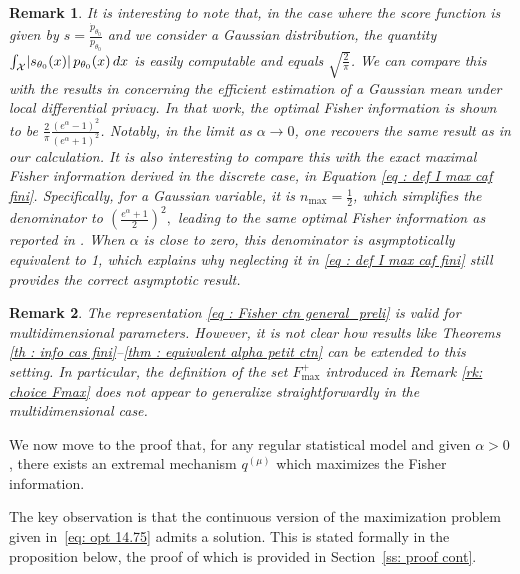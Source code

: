 \documentclass[a4paper, 11pt]{article}
\newtheorem{rem}{Remark}
\theoremstyle{definition}
\DeclarePairedDelimiter{\abs}{\lvert}{\rvert}
\begin{document}
{\begin{rem}
It is interesting to note that, in the case where the score function is given by $s = \frac{\dot{p}_{\theta_0}}{p_{\theta_0}}$ 
and we consider a Gaussian distribution, the quantity $\int_{\mathcal{X}} \abs{s_{\theta_0}(x)} \, p_{\theta_0}(x) \, dx$
is easily computable and equals \( \sqrt{\frac{2}{\pi}} \). We can compare this with the results in \cite{KalSte} concerning the efficient estimation of a Gaussian mean under local differential privacy. In that work, the optimal Fisher information is shown to be 
$\frac{2}{\pi}\frac{(e^\alpha - 1)^2}{(e^\alpha + 1)^2}$.
Notably, in the limit as \( \alpha \to 0 \), one recovers the same result as in our calculation. It is also interesting to compare this with the exact maximal Fisher information derived in the discrete case, in Equation \eqref{eq : def I max caf fini}. Specifically, for a Gaussian variable, it is \( n_{\max} = \frac{1}{2} \), which simplifies the denominator to $\left( \frac{e^\alpha + 1}{2} \right)^2,$
leading to the same optimal Fisher information as reported in \cite{KalSte}. When \( \alpha \) is close to zero, this denominator is asymptotically equivalent to 1, which explains why neglecting it in \eqref{eq : def I max caf fini} still provides the correct asymptotic result. %

\end{rem}
\begin{rem}
	The representation \eqref{eq : Fisher ctn general_preli} is valid for multidimensional parameters. However, it is not clear how results like Theorems \ref{th : info cas fini}--\ref{thm : equivalent alpha petit ctn} can be extended to this setting. In particular, the definition of the set $F^+_\text{max}$ introduced in Remark \ref{rk: choice Fmax} does not appear to generalize straightforwardly in the multidimensional case.
\end{rem}


We now move to the proof that, for any regular statistical model and given $\alpha > 0$, there exists an extremal mechanism $q^{(\mu)}$ which maximizes the Fisher information.

The key observation is that the continuous version of the maximization problem given in~\eqref{eq: opt 14.75} admits a solution. This is stated formally in the proposition below, the proof of which is provided in Section~\ref{ss: proof cont}. 

}
\end{document}
